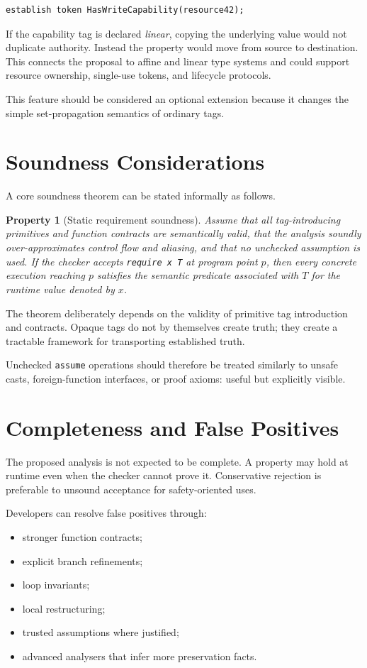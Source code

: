 \documentclass[11pt]{article}
\newtheorem{property}{Property}
\begin{document}
\begin{lstlisting}
establish token HasWriteCapability(resource42);
\end{lstlisting}

If the capability tag is declared \emph{linear}, copying the underlying value would not duplicate authority. Instead the property would move from source to destination. This connects the proposal to affine and linear type systems and could support resource ownership, single-use tokens, and lifecycle protocols.

This feature should be considered an optional extension because it changes the simple set-propagation semantics of ordinary tags.

\section{Soundness Considerations}
A core soundness theorem can be stated informally as follows.

\begin{property}[Static requirement soundness]
Assume that all tag-introducing primitives and function contracts are semantically valid, that the analysis soundly over-approximates control flow and aliasing, and that no unchecked assumption is used. If the checker accepts \texttt{require x T} at program point $p$, then every concrete execution reaching $p$ satisfies the semantic predicate associated with $T$ for the runtime value denoted by $x$.
\end{property}

The theorem deliberately depends on the validity of primitive tag introduction and contracts. Opaque tags do not by themselves create truth; they create a tractable framework for transporting established truth.

Unchecked \texttt{assume} operations should therefore be treated similarly to unsafe casts, foreign-function interfaces, or proof axioms: useful but explicitly visible.

\section{Completeness and False Positives}
The proposed analysis is not expected to be complete. A property may hold at runtime even when the checker cannot prove it. Conservative rejection is preferable to unsound acceptance for safety-oriented uses.

Developers can resolve false positives through:
\begin{itemize}
  \item stronger function contracts;
  \item explicit branch refinements;
  \item loop invariants;
  \item local restructuring;
  \item trusted assumptions where justified;
  \item advanced analysers that infer more preservation facts.
\end{itemize}
\end{document}
